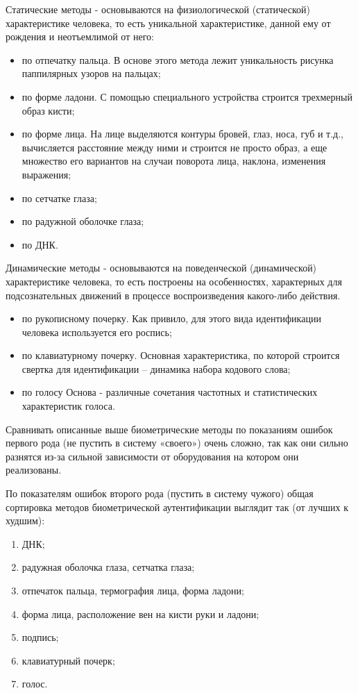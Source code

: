 Статические методы - основываются на физиологической (статической) характеристике человека, то есть уникальной характеристике, данной ему от рождения и неотъемлимой от него:
\begin{itemize}
  \item по отпечатку пальца. В основе этого метода лежит уникальность рисунка паппилярных узоров на пальцах;
  \item по форме ладони. С помощью специального устройства строится трехмерный образ кисти;
  \item по форме лица. На лице выделяются контуры бровей, глаз, носа, губ и т.д., вычисляется расстояние между ними и строится не просто образ, а еще множество его вариантов на случаи поворота лица, наклона, изменения выражения;
  \item по сетчатке глаза;
  \item по радужной оболочке глаза;
  \item по ДНК.
\end{itemize}

Динамические методы - основываются на поведенческой (динамической) характеристике человека, то есть построены на особенностях, характерных для подсознательных движений в процессе воспроизведения какого-либо действия.
\begin{itemize}
  \item по рукописному почерку. Как привило, для этого вида идентификации человека используется его роспись;
  \item по клавиатурному почерку. Основная характеристика, по которой строится свертка для идентификации – динамика набора кодового слова;
  \item по голосу Основа - различные сочетания частотных и статистических характеристик голоса.
\end{itemize}
Сравнивать описанные выше биометрические методы по показаниям ошибок первого рода (не пустить в систему «своего») очень сложно, так как они сильно разнятся из-за сильной зависимости от оборудования на котором они реализованы.

По показателям ошибок второго рода (пустить в систему чужого) общая сортировка методов биометрической аутентификации выглядит так (от лучших к худшим):
\begin{enumerate}
  \item ДНК;
  \item радужная оболочка глаза, сетчатка глаза;
  \item отпечаток пальца, термография лица, форма ладони;
  \item форма лица, расположение вен на кисти руки и ладони;
  \item подпись;
  \item клавиатурный почерк;
  \item голос.
\end{enumerate}

